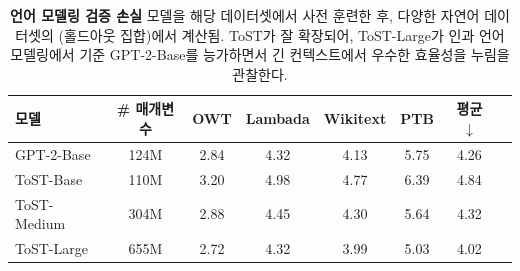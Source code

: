 \documentclass[../../book-main_ko.tex]{subfiles}
\begin{document}
\begin{table}[!htbp]
    \centering
    \begin{tabular}{@{}lccc|cc|cc@{}}
        \toprule
        모델        & \# 매개변수 & OWT & Lambada & Wikitext & PTB & 평균 $\downarrow$ \\
        \midrule
        \midrule
        GPT-2-Base & 124M & 2.84 & 4.32 & 4.13 & 5.75 & 4.26 \\
        ToST-Base & 110M & 3.20 & 4.98 & 4.77 & 6.39 & 4.84 \\
        ToST-Medium & 304M & 2.88 & 4.45 & 4.30 & 5.64 & 4.32 \\
        ToST-Large & 655M & 2.72 & 4.32 & 3.99 & 5.03 & 4.02 \\
        \bottomrule
    \end{tabular}%
    \caption{\small\textbf{언어 모델링 검증 손실}
모델을 해당 데이터셋에서 사전 훈련한 후, 다양한 자연어 데이터셋의 (홀드아웃 집합)에서 계산됨. ToST가 잘 확장되어, ToST-Large가 인과 언어 모델링에서 기준 GPT-2-Base를 능가하면서 긴 컨텍스트에서 우수한 효율성을 누림을 관찰한다.}
    \label{tab:tost_lm}
\end{table}
\end{document}
